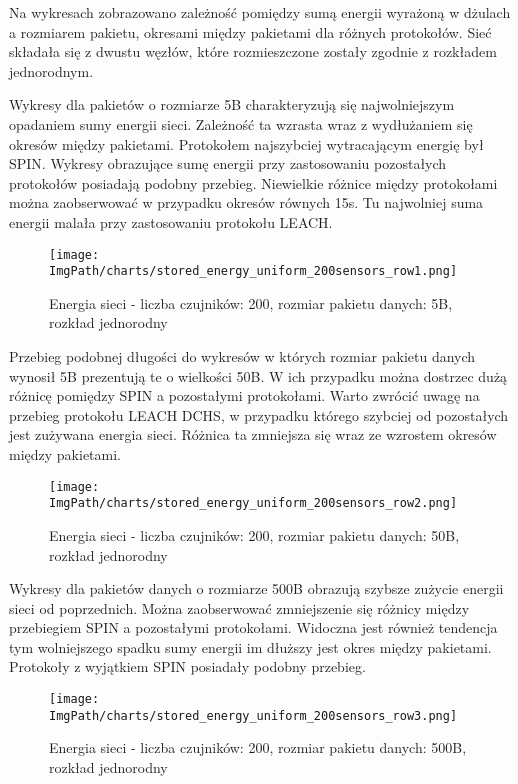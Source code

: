 Na wykresach zobrazowano zależność pomiędzy sumą energii wyrażoną w dżulach a rozmiarem pakietu, okresami między pakietami dla różnych protokołów. Sieć składała się z dwustu węzłów, które rozmieszczone zostały zgodnie z rozkładem jednorodnym.

Wykresy dla pakietów o rozmiarze 5B charakteryzują się najwolniejszym opadaniem sumy energii sieci. Zależność ta wzrasta wraz z wydłużaniem się okresów między pakietami. Protokołem najszybciej wytracającym energię był SPIN. Wykresy obrazujące sumę energii przy zastosowaniu pozostałych protokołów posiadają podobny przebieg. Niewielkie różnice między protokołami można zaobserwować w przypadku okresów równych 15s. Tu najwolniej suma energii malała przy zastosowaniu protokołu LEACH.

\begin{figure}[H]
	\begin{center}
		\texttt{[image: \\ImgPath/charts/stored\_energy\_uniform\_200sensors\_row1.png]}
	\end{center}
	\caption{Energia sieci - liczba czujników: 200, rozmiar pakietu danych: 5B, rozkład jednorodny}
\end{figure}

Przebieg podobnej długości do wykresów w których rozmiar pakietu danych wynosił 5B prezentują te o wielkości 50B. W ich przypadku można dostrzec dużą różnicę pomiędzy SPIN a pozostałymi protokołami.  Warto zwrócić uwagę na przebieg protokołu LEACH DCHS, w przypadku którego szybciej od pozostałych jest zużywana energia sieci. Różnica ta zmniejsza się wraz ze wzrostem okresów między pakietami. 

\begin{figure}[H]
	\begin{center}
		\texttt{[image: \\ImgPath/charts/stored\_energy\_uniform\_200sensors\_row2.png]}
	\end{center}
	\caption{Energia sieci - liczba czujników: 200, rozmiar pakietu danych: 50B, rozkład jednorodny}
\end{figure}

Wykresy dla pakietów danych o rozmiarze 500B obrazują szybsze zużycie energii sieci od poprzednich.  Można zaobserwować zmniejszenie się różnicy między przebiegiem SPIN a pozostałymi protokołami. Widoczna jest również tendencja tym wolniejszego spadku sumy energii im dłuższy jest okres między pakietami. Protokoły z wyjątkiem SPIN  posiadały podobny przebieg.

\begin{figure}[H]
	\begin{center}
		\texttt{[image: \\ImgPath/charts/stored\_energy\_uniform\_200sensors\_row3.png]}
	\end{center}
	\caption{Energia sieci - liczba czujników: 200, rozmiar pakietu danych: 500B, rozkład jednorodny}
\end{figure}

